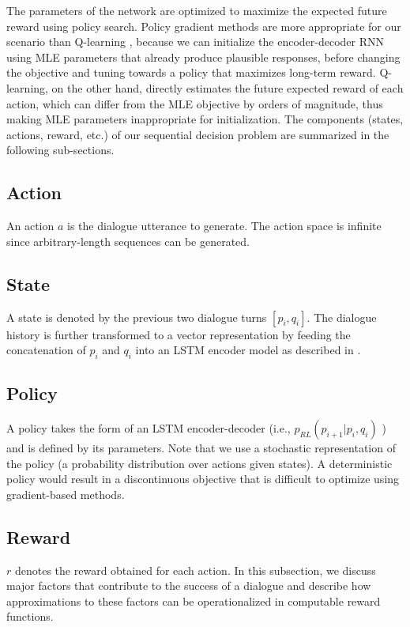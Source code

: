 The parameters of the network are optimized to maximize the expected future reward using policy search.  
Policy gradient methods are more appropriate for our scenario than Q-learning \cite{mnih2013playing}, because we can initialize the encoder-decoder RNN using
MLE parameters that already produce plausible responses, before changing the objective and tuning towards a policy that maximizes long-term reward.
Q-learning, on the other hand, directly estimates the future expected reward of each action, which can differ from the MLE objective by orders of magnitude,
thus making MLE parameters inappropriate for initialization.
The components (states, actions, reward, etc.) of our sequential decision problem are summarized in the following sub-sections.

\subsection{Action} An action $a$ is the dialogue utterance to generate. The action space is infinite since arbitrary-length sequences can be generated.

\subsection{State} A state is denoted by the previous two dialogue turns $[p_i,q_i]$. 
The dialogue history is further transformed to a vector representation by feeding the concatenation of $p_i$ and $q_i$ into an LSTM encoder model as described in .

\subsection{Policy} A policy takes the form of an LSTM encoder-decoder (i.e., $p_{RL}(p_{i+1}|p_{i}, q_i)$ ) and is defined by its parameters.
Note that we use a stochastic representation of the policy (a probability distribution over actions given states).
A deterministic policy would result in a discontinuous objective that is difficult to optimize using gradient-based methods.

\subsection{Reward} $r$ denotes the reward obtained for each action. In this subsection, we discuss major factors that contribute to the success of a dialogue and describe how 
approximations to these factors can be operationalized in computable reward functions. 

